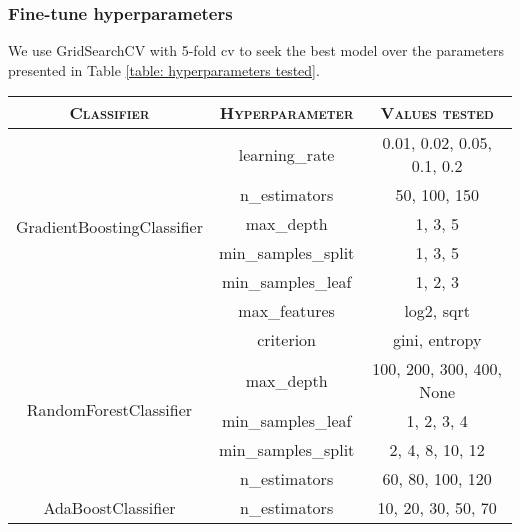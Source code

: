 \documentclass[12pt]{article}
\begin{document}
\subsubsection{Fine-tune hyperparameters}
We use GridSearchCV with 5-fold \gls{cv} to seek the best model over the parameters presented in Table \ref{table: hyperparameters tested}.
\begin{table}
    \centering
    \begin{tabular}{ccc}
        \toprule
        \textsc{Classifier}                         & \textsc{Hyperparameter} & \textsc{Values tested}                   \\
        \midrule
        \multirow{6}{*}{GradientBoostingClassifier} & learning\_rate          & 0.01, 0.02, 0.05, 0.1, 0.2               \\
                                                    & n\_estimators           & 50, 100, 150                             \\
                                                    & max\_depth              & 1, 3, 5                                  \\
                                                    & min\_samples\_split     & 1, 3, 5                                  \\
                                                    & min\_samples\_leaf      & 1, 2, 3                                  \\
                                                    & max\_features           & log2, sqrt                               \\
        \midrule
        \multirow{5}{*}{RandomForestClassifier}     & criterion               & gini, entropy                            \\
                                                    & max\_depth              & 100, 200, 300, 400, None                 \\
                                                    & min\_samples\_leaf      & 1, 2, 3, 4                               \\
                                                    & min\_samples\_split     & 2, 4, 8, 10, 12                          \\
                                                    & n\_estimators           & 60, 80, 100, 120                         \\
        \midrule
        \multirow{3}{*}{AdaBoostClassifier}         & n\_estimators           & 10, 20, 30, 50, 70                       \\

\end{tabular}
\end{table}
\end{document}
